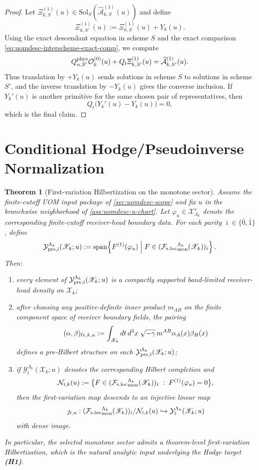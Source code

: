 \documentclass[11pt]{article}
\theoremstyle{definition}
\theoremstyle{plain}
\newtheorem{theorem}[definition]{Theorem}
\theoremstyle{remark}
\newcommand{\Fsloc}{\mathcal F_{\rm s.loc}}
\newcommand{\Xscr}{\mathscr X}
\newcommand{\Ozero}{\mathcal O^{(0)}}
\newcommand{\Xione}{\Xi^{(1)}}
\newcommand{\Qt}{Q_t}
\newcommand{\into}{\hookrightarrow}
\begin{document}
\begin{proof}
Let \(\Xione_{k,S}(u)\in\mathrm{Sol}_{S}(\widehat{\mathcal A}_{k,S}^{(1)}(u))\) and define
\[
\Xione_{k,S'}(u):=\Xione_{k,S}(u)+Y_k(u).
\]
Using the exact descendant equation in scheme \(S\) and the exact comparison
\eqref{eq:uomdesc-interscheme-exact-comp}, we compute
\[
Q_{u,S'}^{\rm phys}\Ozero_k(u)+\Qt\Xione_{k,S'}(u)
=
\widehat{\mathcal A}_{k,S'}^{(1)}(u).
\]
Thus translation by \(+Y_k(u)\) sends solutions in scheme \(S\) to solutions in scheme \(S'\), and
the inverse translation by \(-Y_k(u)\) gives the converse inclusion.
If \(Y_k'(u)\) is another primitive for the same chosen pair of representatives, then
\[
\Qt\big(Y_k'(u)-Y_k(u)\big)=0,
\]
which is the final claim.
\end{proof}

\section{Conditional Hodge/Pseudoinverse Normalization}
\label{sec:uomdesc-hodge}

\begin{theorem}[First-variation Hilbertization on the monotone sector]
\label{thm:uomdesc-first-var}
Assume the finite-cutoff UOM input package of \cref{sec:uomdesc-scope} and fix
\(u\) in the branchwise neighborhood of \cref{ass:uomdesc-u-chart}.
Let \(\varphi_u\in\mathcal X_{\Lambda_k}^s\) denote the corresponding finite-cutoff
receiver-head boundary data.
For each parity \(\bar\imath\in\{\bar 0,\bar 1\}\), define
\[
\mathcal Y_{{\rm pre},\bar\imath}^{\Lambda_k}(\Xscr_k;u)
:=
\operatorname{span}\!\left\{
F^{(1)}(\varphi_u)
\;\middle|\;
F\in({\Fsloc}_{\rm mon}^{\Lambda_k}(\Xscr_k))_{\bar\imath}
\right\}.
\]
Then:
\begin{enumerate}[leftmargin=2em]
\item every element of \(\mathcal Y_{{\rm pre},\bar\imath}^{\Lambda_k}(\Xscr_k;u)\) is a compactly
  supported band-limited receiver-head density on \(\Xscr_k\);
\item after choosing any positive-definite inner product \(m_{AB}\) on the finite component space
  of receiver boundary fields, the pairing
  \[
  (\alpha,\beta)_{{\rm fv},k,u}
  :=
  \int_{\Xscr_k}dt\,d^3x\;\sqrt{-\gamma}\,m^{AB}\alpha_A(x)\beta_B(x)
  \]
  defines a pre-Hilbert structure on each
  \(\mathcal Y_{{\rm pre},\bar\imath}^{\Lambda_k}(\Xscr_k;u)\);
\item if \(\mathcal Y_{\bar\imath}^{\Lambda_k}(\Xscr_k;u)\) denotes the corresponding Hilbert
  completion and
  \[
  \mathcal N_{\bar\imath,k}(u)
  :=
  \big\{
  F\in({\Fsloc}_{\rm mon}^{\Lambda_k}(\Xscr_k))_{\bar\imath}
  \;:\;
  F^{(1)}(\varphi_u)=0
  \big\},
  \]
  then the first-variation map descends to an injective linear map
  \[
  \jmath_{\bar\imath,u}:
  ({\Fsloc}_{\rm mon}^{\Lambda_k}(\Xscr_k))_{\bar\imath}/\mathcal N_{\bar\imath,k}(u)
  \into
  \mathcal Y_{\bar\imath}^{\Lambda_k}(\Xscr_k;u)
  \]
  with dense image.
\end{enumerate}
In particular, the selected monotone sector admits a theorem-level first-variation Hilbertization,
which is the natural analytic input underlying the Hodge target \textbf{(H1)}.
\end{theorem}
\end{document}
